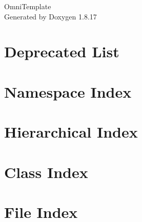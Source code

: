 \let\mypdfximage\pdfximage\def\pdfximage{\immediate\mypdfximage}\documentclass[twoside]{book}
\newcommand{\+}{\discretionary{\mbox{\scriptsize$\hookleftarrow$}}{}{}}
\newcommand{\clearemptydoublepage}{%
  \newpage{\pagestyle{empty}\cleardoublepage}%
}
\begin{document}
\hypersetup{pageanchor=false,
             bookmarksnumbered=true,
             pdfencoding=unicode
            }
\begin{titlepage}
\vspace*{7cm}
\begin{center}%
{\Large Omni\+Template }\\
\vspace*{1cm}
{\large Generated by Doxygen 1.8.17}\\
\end{center}
\end{titlepage}
\clearemptydoublepage
{}
\tableofcontents
\clearemptydoublepage
{}
\hypersetup{pageanchor=true}

\chapter{Deprecated List}
\label{deprecated}

\chapter{Namespace Index}

\chapter{Hierarchical Index}

\chapter{Class Index}

\chapter{File Index}

\end{document}
